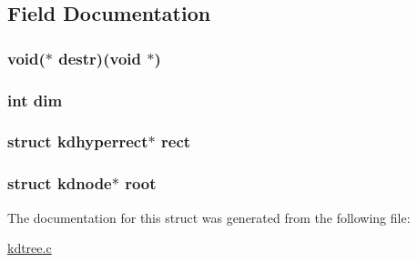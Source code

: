 \subsection{\-Field \-Documentation}
\hypertarget{a00011_a7d06069e4fb5ffe40d5db88c0081f3ac_a7d06069e4fb5ffe40d5db88c0081f3ac}{
\subsubsection[{destr}]{\setlength{\rightskip}{0pt plus 5cm}void($\ast$ {\bf destr})(void $\ast$)}}\label{da/d45/a00011_a7d06069e4fb5ffe40d5db88c0081f3ac_a7d06069e4fb5ffe40d5db88c0081f3ac}
\hypertarget{a00011_a70b5e28b5bc3d1b63a7435c5fe50b837_a70b5e28b5bc3d1b63a7435c5fe50b837}{
\subsubsection[{dim}]{\setlength{\rightskip}{0pt plus 5cm}int {\bf dim}}}\label{da/d45/a00011_a70b5e28b5bc3d1b63a7435c5fe50b837_a70b5e28b5bc3d1b63a7435c5fe50b837}
\hypertarget{a00011_aa40b9a36013f3e2014bd44fb27909ca2_aa40b9a36013f3e2014bd44fb27909ca2}{
\subsubsection[{rect}]{\setlength{\rightskip}{0pt plus 5cm}struct {\bf kdhyperrect}$\ast$ {\bf rect}}}\label{da/d45/a00011_aa40b9a36013f3e2014bd44fb27909ca2_aa40b9a36013f3e2014bd44fb27909ca2}
\hypertarget{a00011_a75f7244d061840423e44a33990f08d07_a75f7244d061840423e44a33990f08d07}{
\subsubsection[{root}]{\setlength{\rightskip}{0pt plus 5cm}struct {\bf kdnode}$\ast$ {\bf root}}}\label{da/d45/a00011_a75f7244d061840423e44a33990f08d07_a75f7244d061840423e44a33990f08d07}


\-The documentation for this struct was generated from the following file\-:\begin{DoxyCompactItemize}
\item 
\hyperlink{a00013}{kdtree.\-c}\end{DoxyCompactItemize}
